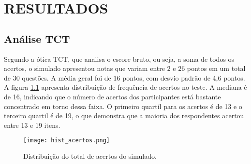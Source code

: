 \chapter{RESULTADOS}

\section{Análise TCT}

Segundo a ótica TCT, que analisa o escore bruto, ou seja, a soma de todos os acertos, o simulado apresentou notas que variam entre 2 e 26 pontos em um total de 30 questões. A média geral foi de 16 pontos, com desvio padrão de 4,6 pontos. A figura \ref{fig:hist_acertos} apresenta distribuição de frequência de acertos no teste. A mediana é de 16, indicando que o número de acertos dos participantes está bastante concentrado em torno dessa faixa. O primeiro quartil para os acertos é de 13 e o terceiro quartil é de 19, o que demonstra que a maioria dos respondentes acertou entre 13 e 19 itens.

\begin{figure}[H]
	\centering
	\texttt{[image: hist\_acertos.png]}
	\caption{Distribuição do total de acertos do simulado.}
	\label{fig:hist_acertos}
\end{figure}

